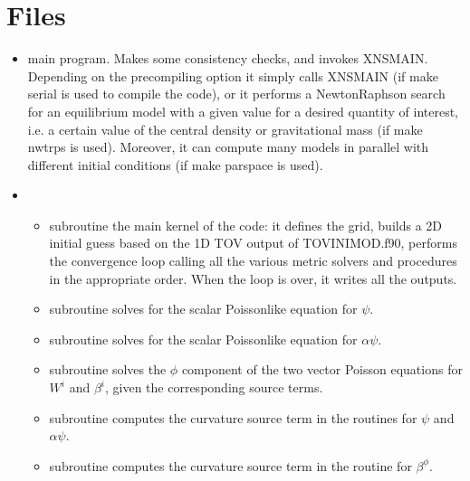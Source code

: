 \documentclass[letterpaper,10pt,english]{sphinxmanual}
\begin{document}
\section{Files}
\label{\detokenize{files_outputs:files}}\begin{itemize}
\item {} 
\sphinxAtStartPar
{} \sphinxhyphen{} main program. Makes some consistency checks, and invokes XNSMAIN. Depending on
the pre\sphinxhyphen{}compiling option it simply calls XNSMAIN (if make serial is used to compile the code), or it
performs a Newton\sphinxhyphen{}Raphson search for an equilibrium model with a given value for a desired quantity
of interest, i.e. a certain value of the central density or gravitational mass (if make nwtrps is used). Moreover, it can compute many models in parallel with different initial conditions (if make parspace is used).


\item {} 
\sphinxAtStartPar
{}
\begin{itemize}
\item {} 
\sphinxAtStartPar
subroutine  \sphinxhyphen{} the main kernel of the code: it defines the grid, builds a 2D initial guess based on the 1D TOV output of TOVINIMOD.f90, performs the convergence loop calling all the various metric solvers and procedures in the appropriate order. When the loop is over, it writes all the outputs.

\item {} 
\sphinxAtStartPar
subroutine  \sphinxhyphen{} solves for the scalar Poisson\sphinxhyphen{}like equation for \(\psi\).

\item {} 
\sphinxAtStartPar
subroutine  \sphinxhyphen{} solves for the scalar Poisson\sphinxhyphen{}like equation for \(\alpha \psi\).

\item {} 
\sphinxAtStartPar
subroutine  \sphinxhyphen{} solves the \(\phi\) component of the two vector Poisson equations for \(W^i\) and \(\beta ^i\), given the corresponding source terms.

\item {} 
\sphinxAtStartPar
subroutine  \sphinxhyphen{} computes the curvature source term in the routines for \(\psi\) and \(\alpha \psi\).

\item {} 
\sphinxAtStartPar
subroutine  \sphinxhyphen{} computes the curvature source term in the routine for \(\beta ^\phi\).


\end{itemize}
\end{itemize}
\end{document}
